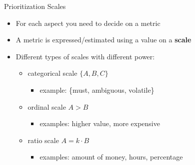 \begin{Slide}{Prioritization Scales}
\begin{itemize}
\item For each aspect you need to decide on a metric
\item A metric is expressed/estimated using a value on a \textbf{scale}
\item Different types of scales with different power:
\begin{itemize}
\item categorical scale $\{A, B, C\}$ 
\begin{itemize}
\item example: \{must, ambiguous, volatile\}
\end{itemize}
\item ordinal scale $A > B$
\begin{itemize}
\item examples: higher value, more expensive
\end{itemize}
\item ratio scale $A = k \cdot B$
\begin{itemize}
\item examples: amount of money, hours, percentage

\end{itemize}
\end{itemize}
\end{itemize}
\end{Slide}